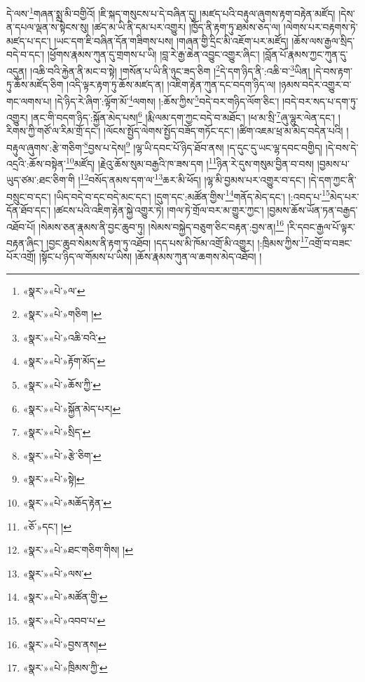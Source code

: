 \documentclass[12pt,a4paper]{book}
\begin{document}
དེ་ལས་\footnote{«སྣར་»«པེ་»ལ་}གཞན་སྨྲ་མི་བགྱིའོ། །ཇི་སྐད་གསུངས་པ་དེ་བཞིན་དུ། །མཛད་པའི་བརྟུལ་ཞུགས་རྟག་བརྟེན་མཛོད། །དེས་ན་དཔལ་ལྡན་ས་སྟེངས་སུ། །ཚད་མ་ཡི་ནི་དམ་པར་འགྱུར། །ཁྱོད་ནི་རྟག་ཏུ་ཐམས་ཅད་ལ། །ལེགས་པར་བརྟགས་ཏེ་མཛད་པ་དང་། །ཡང་དག་ཇི་བཞིན་དོན་གཟིགས་པས། །གཞན་གྱི་དྲིང་མི་འཇོག་པར་མཛོད། །ཆོས་ལས་རྒྱལ་སྲིད་བདེ་བ་དང་། །ཕྱོགས་རྣམས་ཀུན་དུ་གྲགས་པ་ཡི། །བླ་རེ་རྒྱ་ཆེན་འབྱུང་འགྱུར་ཞིང་། །བློན་པོ་རྣམས་ཀྱང་ཀུན་དུ་འདུན། །འཆི་བའི་རྐྱེན་ནི་མང་བ་སྟེ། །གསོན་པ་ཡི་ནི་ཉུང་ཟད་ཅིག །\footnote{«སྣར་»«པེ་»གཅིག །}དེ་དག་ཉིད་ནི་:འཆི་བ་\footnote{«སྣར་»«པེ་»འཆི་བའི་}ཡིན། །དེ་བས་རྟག་ཏུ་ཆོས་མཛོད་ཅིག །འདི་ལྟར་རྟག་ཏུ་ཆོས་མཛད་ན། །འཇིག་རྟེན་ཀུན་དང་བདག་ཉིད་ལ། །ཉམས་བདེར་འགྱུར་བ་གང་ལགས་པ། །དེ་ཉིད་རེ་ཞིག་:ལྟོག་མོ་\footnote{«སྣར་»«པེ་»རྟོག་མོད་}ལགས། །:ཆོས་ཀྱིས་\footnote{«སྣར་»«པེ་»ཆོས་ཀྱི་}བདེ་བར་གཉིད་ལོག་ཅིང་། །བདེ་བར་སད་པ་དག་ཏུ་འགྱུར། །ནང་གི་བདག་ཉིད་:སྐྱོན་མེད་པས།\footnote{«སྣར་»«པེ་»སྐྱོན་མེད་པར།} །རྨི་ལམ་དག་ཀྱང་བདེ་བ་མཐོང་། །ཕ་མ་སྲི་\footnote{«སྣར་»«པེ་»སྲིད་}ཞུ་ལྷུར་ལེན་དང་། །རིགས་ཀྱི་གཙོ་ལ་རིམ་གྲོ་དང་། །ལོངས་སྤྱོད་ལེགས་སྤྱོད་བཟོད་གཏོང་དང་། །ཚིག་འཇམ་ཕྲ་མ་མེད་བདེན་པའི། །བརྟུལ་ཞུགས་:རྩེ་གཅིག་\footnote{«སྣར་»«པེ་»རྩེ་ཅིག་}བྱས་པ་དེས།\footnote{«སྣར་»«པེ་»སྟེ།} །ལྷ་ཡི་དབང་པོ་ཉིད་ཐོབ་ནས། །ད་དུང་དུ་ཡང་ལྷ་དབང་བགྱིད། །དེ་བས་དེ་འདྲའི་:ཆོས་བསྟེན་\footnote{«སྣར་»«པེ་»མཆོད་རྟེན་}མཛོད། །རྗེའུ་ཆོས་སུམ་བརྒྱའི་ཁ་ཟས་དག །\footnote{«ཅོ་»དང་། །}ཉིན་རེ་དུས་གསུམ་བྱིན་བ་བས། །བྱམས་པ་ཡུད་ཙམ་:ཐང་ཅིག་གི །\footnote{«སྣར་»«པེ་»ཐང་གཅིག་གིས། །}བསོད་ནམས་དག་ལ་\footnote{«སྣར་»«པེ་»ལས་}ཆར་མི་ཕོད། །ལྷ་མི་བྱམས་པར་འགྱུར་བ་དང་། །དེ་དག་ཀྱང་ནི་བསྲུང་བ་དང་། །ཡིད་བདེ་བ་དང་བདེ་མང་དང་། །དུག་དང་:མཚོན་གྱིས་\footnote{«སྣར་»«པེ་»མཚོན་གྱི་}གནོད་མེད་དང་། །:འབད་པ་\footnote{«སྣར་»«པེ་»འབབ་པ་}མེད་པར་དོན་ཐོབ་དང་། །ཚངས་པའི་འཇིག་རྟེན་སྐྱེ་འགྱུར་ཏེ། །གལ་ཏེ་གྲོལ་བར་མ་གྱུར་ཀྱང་། །བྱམས་ཆོས་ཡོན་ཏན་བརྒྱད་འཐོབ་པོ། །སེམས་ཅན་རྣམས་ནི་བྱང་ཆུབ་ཏུ། །སེམས་བསྐྱེད་བཅུག་ཅིང་བརྟན་:བྱས་ན།\footnote{«སྣར་»«པེ་»བྱས་ནས།} །རི་དབང་རྒྱལ་པོ་ལྟར་བརྟན་ཞིང་། །བྱང་ཆུབ་སེམས་ནི་རྟག་ཏུ་འཐོབ། །དད་པས་མི་ཁོམ་འགྲོ་མི་འགྱུར། །:ཁྲིམས་ཀྱིས་\footnote{«སྣར་»«པེ་»ཁྲིམས་ཀྱི་}འགྲོ་བ་བཟང་པོར་འགྲོ། །སྟོང་པ་ཉིད་ལ་གོམས་པ་ཡིས། །ཆོས་རྣམས་ཀུན་ལ་ཆགས་མེད་འཐོབ། །
\end{document}
